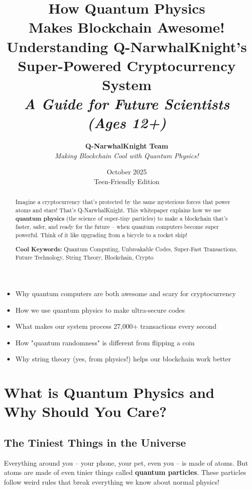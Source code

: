 \documentclass[11pt,a4paper]{article}
\title{\textbf{\Huge How Quantum Physics\\Makes Blockchain Awesome!}\\
\vspace{0.5cm}
{\Large Understanding Q-NarwhalKnight's\\
Super-Powered Cryptocurrency System}\\
\vspace{0.5cm}
{\large \textit{A Guide for Future Scientists (Ages 12+)}}}
\author{
\textbf{Q-NarwhalKnight Team}\\
\textit{Making Blockchain Cool with Quantum Physics!}
}
\date{October 2025\\Teen-Friendly Edition}
\begin{document}
\maketitle

\begin{abstract}
\large
Imagine a cryptocurrency that's protected by the same mysterious forces that power atoms and stars! That's Q-NarwhalKnight. This whitepaper explains how we use \textbf{quantum physics} (the science of super-tiny particles) to make a blockchain that's faster, safer, and ready for the future -- when quantum computers become super powerful. Think of it like upgrading from a bicycle to a rocket ship! 

\textbf{Cool Keywords:} Quantum Computing, Unbreakable Codes, Super-Fast Transactions, Future Technology, String Theory, Blockchain, Crypto
\end{abstract}

\vspace{0.5cm}

\begin{tcolorbox}[colback=coolblue!10,colframe=coolblue,title=\textbf{What You'll Learn}]
\large
\begin{itemize}
    \item Why quantum computers are both awesome and scary for cryptocurrency
    \item How we use quantum physics to make ultra-secure codes
    \item What makes our system process 27,000+ transactions every second
    \item How "quantum randomness" is different from flipping a coin
    \item Why string theory (yes, from physics!) helps our blockchain work better
\end{itemize}
\end{tcolorbox}

\newpage
\tableofcontents
\newpage

\section{What is Quantum Physics and Why Should You Care?}

\subsection{The Tiniest Things in the Universe}

Everything around you -- your phone, your pet, even you -- is made of atoms. But atoms are made of even tinier things called \textbf{quantum particles}. These particles follow weird rules that break everything we know about normal physics!
\end{document}
